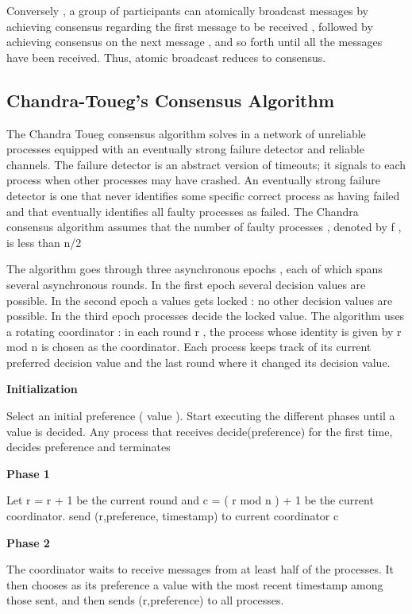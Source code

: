 \documentclass{article}
\begin{document}
Conversely , a group of participants can atomically broadcast messages by achieving consensus regarding the first message to be received , followed by achieving consensus on the next message , and so forth until all the messages have been received. Thus, atomic broadcast reduces to consensus.

\subsection{Chandra-Toueg's Consensus Algorithm}

The Chandra Toueg consensus algorithm solves in a network of unreliable processes equipped with an eventually strong failure detector and reliable channels.
The failure detector is an abstract version of timeouts; it signals to each process when other processes may have crashed.
An eventually strong failure detector is one that never identifies some specific correct process as having failed and that eventually identifies all faulty processes as failed. The Chandra consensus algorithm assumes that the number of faulty processes , denoted by f , is less than n/2 


The algorithm goes through three asynchronous epochs , each of which spans several asynchronous rounds. In the first epoch several decision values are possible. In the second epoch a values gets locked : no other decision values are possible. In the third epoch processes decide the locked value.
The algorithm uses a rotating coordinator : in each round r , the process whose identity is given by r mod n is chosen as the coordinator.
Each process keeps track of its current preferred decision value and the last round where it changed its decision value.

\vspace{3mm}
\textbf{Initialization}

Select an initial preference ( value ). Start executing the different phases until a value is decided. Any process that receives decide(preference) for the first time, decides preference and terminates

\vspace{3mm}
\textbf{Phase 1}

Let r = r + 1 be the current round and c = ( r mod n ) + 1 be the current coordinator. send (r,preference, timestamp) to current coordinator c

\vspace{3mm}
\textbf{Phase 2}

The coordinator waits to receive messages from at least half of the processes. It then chooses as its preference a value with the most recent timestamp among those sent, and then sends (r,preference) to all processes.
\end{document}
